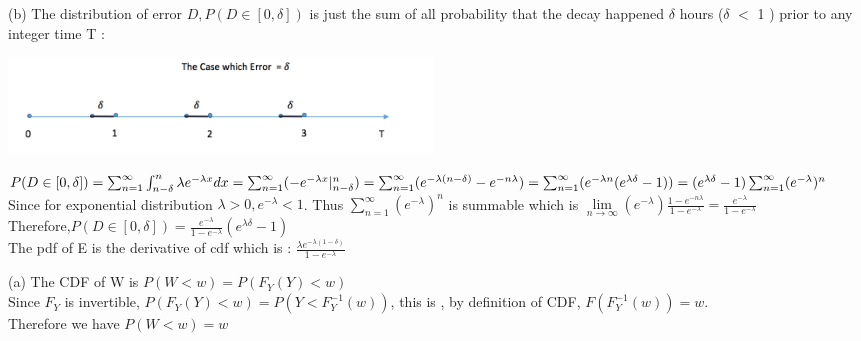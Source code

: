 \documentclass[12pt]{article}
\newenvironment{problem}[2][Problem]{\begin{trivlist}
\item[\hskip \labelsep {\bfseries #1}\hskip \labelsep {\bfseries #2.}]}{\end{trivlist}}
\begin{document}
(b) The distribution of error $D,P(D \in [0, \delta])$ is just the sum of all probability that the decay happened $\delta$ hours ($\delta$ $<$ 1 ) prior to any integer time T  : \\
\begin{center}
	\includegraphics[height=1in]{p1} 
\end{center}
$P(D \in [0,\delta] ) = \sum_{n =1}^{\infty} \int_{n- \delta}^{n} \lambda e^{-\lambda x}dx =  \sum_{n =1}^{\infty} (- e^{-\lambda x}|_{n- \delta}^{n} ) = \sum_{n =1}^{\infty} (e^{-\lambda(n- \delta)} -e^{-n\lambda}) \\=  \sum_{n =1}^{\infty} (e^{-\lambda  n} (e^{\lambda  \delta}-1))  =   (e^{\lambda  \delta}-1) \sum_{n =1}^{\infty} (e^{-\lambda})^n$\\
Since for exponential distribution $\lambda >0 ,  e^{ - \lambda} <1$. Thus  $\sum_{n =1}^{\infty} (e^{-\lambda})^n$ is summable which is $\lim\limits_{n\to \infty}(e^{-\lambda})\frac{1 - e^{-n\lambda}}{1 - e^{-\lambda}} = \frac{e^{-\lambda}}{1- e^{-\lambda}}$\\
Therefore,$ P(D \in [0,\delta]) = \frac{e^{-\lambda}}{1- e^{-\lambda}}  (e^{\lambda  \delta}-1) $\\
The pdf of E is the derivative of cdf which is :
$\frac{\lambda e^{-\lambda(1 - \delta)}}{1- e^{-\lambda}}  $\\

\begin{problem}{5}
\end{problem}
(a)  The CDF of W is $P(W<w) = P(F_Y(Y) < w )$\\
Since $F_Y$ is invertible, $P(F_Y(Y) < w ) = P(Y< F^{-1}_Y(w))$, this is , by definition of CDF, $F(F_Y^{-1}(w)) = w$.\\
Therefore we have $P(W<w)  = w$\\
\end{document}
